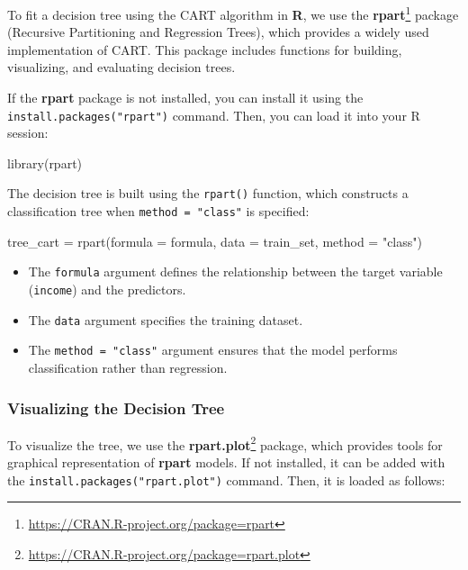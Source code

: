\documentclass[
  11pt,
]{book}
\makeatletter
\newenvironment{Shaded}{}{}
\newcommand{\AttributeTok}[1]{#1}
\newcommand{\FunctionTok}[1]{#1}
\newcommand{\NormalTok}[1]{#1}
\newcommand{\OtherTok}[1]{\textcolor[rgb]{0.39,0.39,0.39}{#1}}
\newcommand{\StringTok}[1]{\textcolor[rgb]{0.39,0.39,0.39}{#1}}
\providecommand{\tightlist}{%
  \setlength{\itemsep}{0pt}\setlength{\parskip}{0pt}}
\renewcommand{\href}[2]{#2\footnote{\url{#1}}}
\newenvironment{kframe}{%
\medskip{}
\setlength{\fboxsep}{.8em}
 \def\at@end@of@kframe{}%
 \ifinner\ifhmode%
  \def\at@end@of@kframe{\end{minipage}}%
  \begin{minipage}{\columnwidth}%
 \fi\fi%
 \def\FrameCommand##1{\hskip\@totalleftmargin \hskip-\fboxsep
 \colorbox{shadecolor}{##1}\hskip-\fboxsep
     \hskip-\linewidth \hskip-\@totalleftmargin \hskip\columnwidth}%
 \MakeFramed {\advance\hsize-\width
   \@totalleftmargin\z@ \linewidth\hsize
   \@setminipage}}%
 {\par\unskip\endMakeFramed%
 \at@end@of@kframe}
\renewenvironment{Shaded}{\begin{kframe}}{\end{kframe}}
\theoremstyle{definition}
\theoremstyle{definition}
\theoremstyle{definition}
\theoremstyle{definition}
\theoremstyle{remark}
\makeatother
\begin{document}
To fit a decision tree using the CART algorithm in \textbf{R}, we use the \href{https://CRAN.R-project.org/package=rpart}{\textbf{rpart}} package (Recursive Partitioning and Regression Trees), which provides a widely used implementation of CART. This package includes functions for building, visualizing, and evaluating decision trees.

If the \textbf{rpart} package is not installed, you can install it using the \texttt{install.packages("rpart")} command. Then, you can load it into your R session:

\begin{Shaded}
\begin{Highlighting}[]
\FunctionTok{library}\NormalTok{(rpart)}
\end{Highlighting}
\end{Shaded}

The decision tree is built using the \texttt{rpart()} function, which constructs a classification tree when \texttt{method\ =\ "class"} is specified:

\begin{Shaded}
\begin{Highlighting}[]
\NormalTok{tree\_cart }\OtherTok{=} \FunctionTok{rpart}\NormalTok{(}\AttributeTok{formula =}\NormalTok{ formula, }\AttributeTok{data =}\NormalTok{ train\_set, }\AttributeTok{method =} \StringTok{"class"}\NormalTok{)}
\end{Highlighting}
\end{Shaded}

\begin{itemize}
\tightlist
\item
  The \texttt{formula} argument defines the relationship between the target variable (\texttt{income}) and the predictors.
\item
  The \texttt{data} argument specifies the training dataset.
\item
  The \texttt{method\ =\ "class"} argument ensures that the model performs classification rather than regression.
\end{itemize}

\subsubsection*{Visualizing the Decision Tree}\label{visualizing-the-decision-tree}


To visualize the tree, we use the \href{https://CRAN.R-project.org/package=rpart.plot}{\textbf{rpart.plot}} package, which provides tools for graphical representation of \textbf{rpart} models. If not installed, it can be added with the \texttt{install.packages("rpart.plot")} command. Then, it is loaded as follows:
\end{document}
